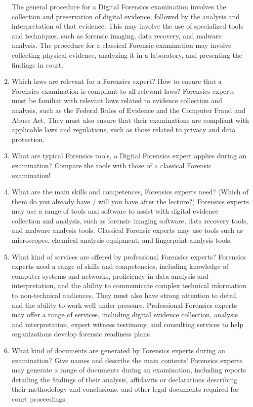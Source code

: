 \documentclass{scrreprt}
\begin{document}
\begin{enumerate}
The general procedure for a Digital Forensics examination involves the collection and preservation of digital evidence, followed by the analysis and interpretation of that evidence. This may involve the use of specialized tools and techniques, such as forensic imaging, data recovery, and malware analysis. The procedure for a classical Forensic examination may involve collecting physical evidence, analyzing it in a laboratory, and presenting the findings in court.
\item Which laws are relevant for a Forensics expert? How to ensure that a Forensics examination is compliant to all relevant laws? 
Forensics experts must be familiar with relevant laws related to evidence collection and analysis, such as the Federal Rules of Evidence and the Computer Fraud and Abuse Act. They must also ensure that their examinations are compliant with applicable laws and regulations, such as those related to privacy and data protection.
\item What are typical Forensics tools, a Digital Forensics expert applies during an examination? Compare the tools with those of a classical Forensic examination! 
\item What are the main skills and competences, Forensics experts need? (Which of them do you already have / will you have after the lecture?) 
Forensics experts may use a range of tools and software to assist with digital evidence collection and analysis, such as forensic imaging software, data recovery tools, and malware analysis tools. Classical Forensic experts may use tools such as microscopes, chemical analysis equipment, and fingerprint analysis tools.
\item What kind of services are offered by professional Forensics experts? 
Forensics experts need a range of skills and competencies, including knowledge of computer systems and networks, proficiency in data analysis and interpretation, and the ability to communicate complex technical information to non-technical audiences. They must also have strong attention to detail and the ability to work well under pressure. Professional Forensics experts may offer a range of services, including digital evidence collection, analysis and interpretation, expert witness testimony, and consulting services to help organizations develop forensic readiness plans.
\item What kind of documents are generated by Forensics experts during an examination? Give names and describe the main contents! 
Forensics experts may generate a range of documents during an examination, including reports detailing the findings of their analysis, affidavits or declarations describing their methodology and conclusions, and other legal documents required for court proceedings.

\end{enumerate}
\end{document}
